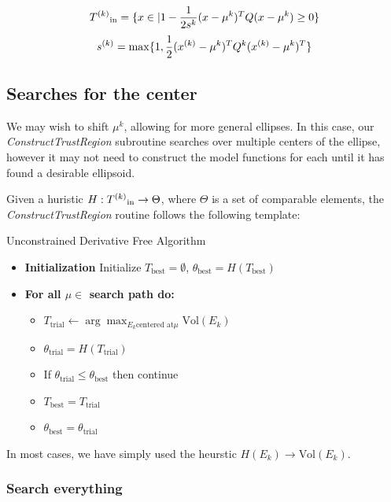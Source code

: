 $${T^{(k)}}_{\text{in}} = \{x \in \mathbb | 1 - \frac 1 {2s^k} (x - \mu^{k})^T Q (x - \mu^{k}) \ge 0\} $$
$${s}^{(k)} = \max \{1, \frac 1 {2} ({x}^{(k)} - \mu^{k})^T Q^k ({x}^{(k)} - \mu^{k})^T \}$$


\subsection{Searches for the center}

We may wish to shift $\mu^k$, allowing for more general ellipses.
In this case, our \emph{ConstructTrustRegion} subroutine searches over multiple centers of the ellipse, however it may not need to construct the model functions for each until it has found a desirable ellipsoid.

Given a huristic $H : {T^{(k)}}_{\text{in}} \to \Theta$, where $\Theta$ is a set of comparable elements, the \emph{ConstructTrustRegion} routine follows the following template:

\begin{algorithm}[H]
    \caption{Unconstrained Derivative Free Algorithm}
    \label{unconstrained_dfo}
    \begin{itemize}
        \item[] \textbf{Initialization} Initialize $T_{\text{best}} = \emptyset$, $\theta_{\text{best}} = H(T_{\text{best}})$
            
        \item[] \textbf{For all $\mu \in$ search path do:} \begin{itemize}
                \item[] $T_{\text{trial}} \gets \arg\max_{E_k \text{centered at} \mu} \text{Vol}(E_k)$
                \item[] $\theta_{\text{trial}} = H(T_{\text{trial}})$
                \item[] If $\theta_{\text{trial}} \le \theta_{\text{best}}$ then continue
                \item[] $T_{\text{best}} = T_{\text{trial}}$
                \item[] $\theta_{\text{best}} = \theta_{\text{trial}}$
            \end{itemize}
    \end{itemize}
\end{algorithm}

In most cases, we have simply used the heurstic $H(E_k) \to \text{Vol}(E_k)$.

\subsubsection{Search everything}

